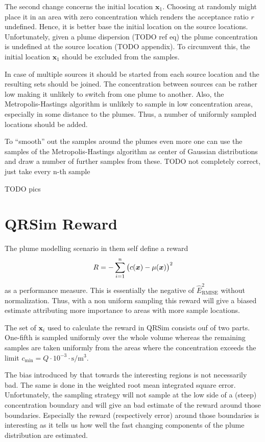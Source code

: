 \documentclass[11pt,a4paper,twoside,BCOR=15mm]{scrreprt}
\newcommand{\vc}[1]{\bm{#1}}
\newcommand{\ped}[1]{_{\mathrm{#1}}}
\begin{document}
The second change concerns the initial location $\vc x_1$. Choosing at randomly 
might place it in an area with zero concentration which renders the acceptance 
ratio $r$ undefined. Hence, it is better base the initial location on the source 
locations. Unfortunately, given a plume dispersion (TODO ref eq) the plume 
concentration is undefined at the source location (TODO appendix). To circumvent 
this, the initial location $\vc x_1$ should be excluded from the samples.

In case of multiple sources it should be started from each source location and 
the resulting sets should be joined. The concentration between sources can be 
rather low making it unlikely to switch from one plume to another. Also, the 
Metropolis-Hastings algorithm is unlikely to sample in low concentration areas, 
especially in some distance to the plumes. Thus, a number of uniformly sampled 
locations should be added.

To ``smooth'' out the samples around the plumes even more one can use the 
samples of the Metropolis-Hastings algorithm as center of Gaussian distributions 
and draw a number of further samples from these.
TODO not completely correct, just take every n-th sample

TODO pics

\section{QRSim Reward}
The plume modelling scenario in \textcite{denardi2013rn} them self define 
a reward
\begin{equation}
    R = - \sum_{i = 1}^n \del{c(\vc x) - \mu(\vc x)}^2
\end{equation}
as a performance measure. This is essentially the negative of 
$\hat{E}\ped{RMISE}^2$ without normalization. Thus, with a non uniform sampling 
this reward will give a biased estimate attributing more importance to areas 
with more sample locations.

The set of $\vc x_i$ used to calculate the reward in QRSim consists ouf of two 
parts. One-fifth is sampled uniformly over the whole volume whereas the 
remaining samples are taken uniformly from the areas where the concentration 
exceeds the limit $c_{\min} = Q \cdot 10^{-3} \cdot 
\si{\second\per\meter\cubed}$.

The bias introduced by that towards the interesting regions is not necessarily 
bad. The same is done in the weighted root mean integrated square error.  
Unfortunately, the sampling strategy will not sample at the low side of 
a (steep) concentration boundary and will give an bad estimate of the reward 
around those boundaries. Especially the reward (respectively error) around those 
boundaries is interesting as it tells us how well the fast changing components 
of the plume distribution are estimated.
\end{document}
